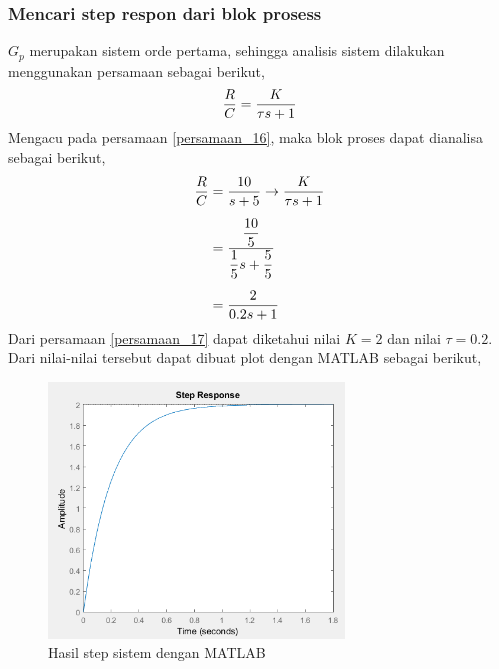 \documentclass[../cover.tex]{subfiles}
\begin{document}
        \subsubsection{Mencari step respon dari blok prosess}
        $G_p$ merupakan sistem orde pertama, sehingga analisis sistem dilakukan menggunakan persamaan sebagai berikut,
            \begin{equation}
                \frac{R}{C} = \frac{K}{\tau s + 1} \\[5pt]
                \label{persamaan_16}
            \end{equation}
            Mengacu pada persamaan \eqref{persamaan_16}, maka blok proses dapat dianalisa sebagai berikut,
            \begin{equation}
                \begin{split}
                    \frac{R}{C} &= \frac{10}{s+5} \rightarrow \frac{K}{\tau s + 1} \\[5pt]
                                &= \frac{\displaystyle \frac{10}{5}}{\displaystyle \frac{1}{5}s + \frac{5}{5}} \\[5pt]
                                &= \frac{2}{0.2s + 1}
                \label{persamaan_17}
                \end{split}
            \end{equation}
            Dari persamaan \eqref{persamaan_17} dapat diketahui nilai $K = 2$ dan nilai $\tau = 0.2$. Dari nilai-nilai tersebut dapat dibuat plot dengan MATLAB sebagai berikut,
            \begin{figure}[H]
                \centering
                \includegraphics[width = 0.7\textwidth]{assets/image/plotStepSys.png}
                \caption{Hasil step sistem dengan MATLAB}
                \label{gambar_3}
            \end{figure}
\end{document}
